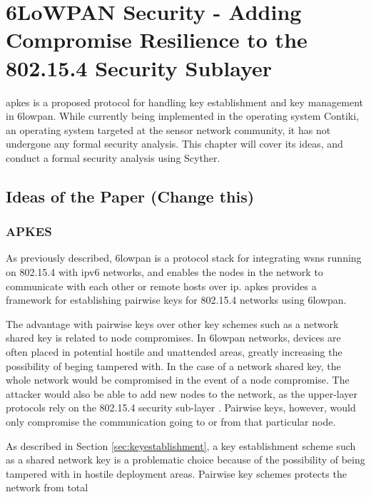 \chapter{6LoWPAN Security - Adding Compromise Resilience to the 802.15.4 Security Sublayer}
\label{chp:krentz-6lowpan}


\gls{apkes} is a proposed protocol for handling key establishment and key management in \gls{6lowpan}. While currently being implemented in the operating system Contiki, an operating system targeted at the sensor network community, it has not undergone any formal security analysis. This chapter will cover its ideas, and conduct a formal security analysis using Scyther. 



\section{Ideas of the Paper (Change this)}


\subsection{APKES}


As previously described, \gls{6lowpan} is a protocol stack for integrating \gls{wsn}s running on 802.15.4 with \gls{ip}v6 networks, and enables the nodes in the network to communicate with each other or remote hosts over \gls{ip}. \gls{apkes} provides a framework for establishing pairwise keys for 802.15.4 networks using \gls{6lowpan}.


The advantage with pairwise keys over other key schemes such as a network shared key is related to node compromises. In \gls{6lowpan} networks, devices are often placed in potential hostile and unattended areas, greatly increasing the possibility of beging tampered with. In the case of a network shared key, the whole network would be compromised in the event of a node compromise. The attacker would also be able to add new nodes to the network, as the upper-layer protocols rely on the 802.15.4 security sub-layer \cite{krentz20136lowpan}. Pairwise keys, however, would only compromise the communication going to or from that particular node. 

As described in Section \ref{sec:keyestablishment}, a key establishment scheme such as a shared network key is a problematic choice because of the possibility of being tampered with in hostile deployment areas. Pairwise key schemes protects the network from total 

